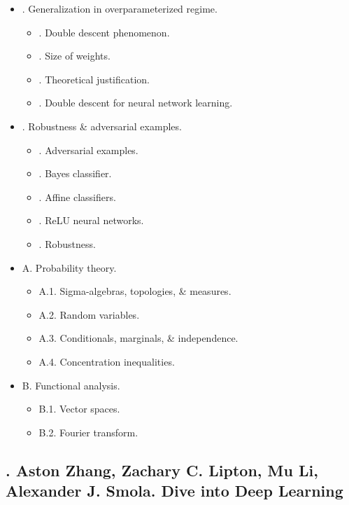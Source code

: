 \documentclass{article}
\begin{document}
\begin{itemize}
\begin{itemize}
	\end{itemize}
	\item {. Generalization in overparameterized regime.}
	\begin{itemize}
		\item {. Double descent phenomenon.}
		\item {. Size of weights.}
		\item {. Theoretical justification.}
		\item {. Double descent for neural network learning.}
	\end{itemize}
	\item {. Robustness \& adversarial examples.}
	\begin{itemize}
		\item {. Adversarial examples.}
		\item {. Bayes classifier.}
		\item {. Affine classifiers.}
		\item {. ReLU neural networks.}
		\item {. Robustness.}
	\end{itemize}
	\item {\sf A. Probability theory.}
	\begin{itemize}
		\item {\sf A.1. Sigma-algebras, topologies, \& measures.}
		\item {\sf A.2. Random variables.}
		\item {\sf A.3. Conditionals, marginals, \& independence.}
		\item {\sf A.4. Concentration inequalities.}
	\end{itemize}
	\item {\sf B. Functional analysis.}
	\begin{itemize}
		\item {\sf B.1. Vector spaces.}
		\item {\sf B.2. Fourier transform.}
	\end{itemize}
\end{itemize}


\subsection{\cite{Zhang_Lipton_Li_Smola2023}. {\sc Aston Zhang, Zachary C. Lipton, Mu Li, Alexander J. Smola}. Dive into Deep Learning}
{}
\end{document}
